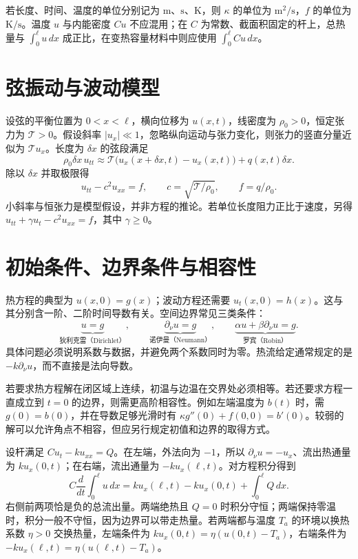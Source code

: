\documentclass[UTF8,12pt,a4paper,fontset=fandol]{ctexbook}
\begin{document}
若长度、时间、温度的单位分别记为 $\mathrm{m}$、$\mathrm{s}$、$\mathrm{K}$，则 $\kappa$ 的单位为 $\mathrm{m}^2/\mathrm{s}$，$f$ 的单位为 $\mathrm{K}/\mathrm{s}$。温度 $u$ 与内能密度 $Cu$ 不应混用；在 $C$ 为常数、截面积固定的杆上，总热量与 $\int_0^\ell u\,dx$ 成正比，在变热容量材料中则应使用 $\int_0^\ell Cu\,dx$。

\section{弦振动与波动模型}
设弦的平衡位置为 $0<x<\ell$，横向位移为 $u(x,t)$，线密度为 $\rho_0>0$，恒定张力为 $\mathcal T>0$。假设斜率 $|u_x|\ll1$，忽略纵向运动与张力变化，则张力的竖直分量近似为 $\mathcal T u_x$。长度为 $\delta x$ 的弦段满足
\[
 \rho_0\delta x\,u_{tt}\approx
 \mathcal T\bigl(u_x(x+\delta x,t)-u_x(x,t)\bigr)+q(x,t)\delta x.
\]
除以 $\delta x$ 并取极限得
\begin{equation}
 u_{tt}-c^2u_{xx}=f,\qquad
 c=\sqrt{\mathcal T/\rho_0},\qquad f=q/\rho_0.
 \label{eq:wave-model}
\end{equation}
小斜率与恒张力是模型假设，并非方程的推论。若单位长度阻力正比于速度，另得 $u_{tt}+\gamma u_t-c^2u_{xx}=f$，其中 $\gamma\ge0$。

\section{初始条件、边界条件与相容性}
热方程的典型为 $u(x,0)=g(x)$；波动方程还需要 $u_t(x,0)=h(x)$。这与其分别含一阶、二阶时间导数有关。空间边界常见三类条件：
\[
 \underbrace{u=g}_{\text{狄利克雷（Dirichlet）}},\qquad
 \underbrace{\partial_\nu u=g}_{\text{诺伊曼（Neumann）}},\qquad
 \underbrace{\alpha u+\beta\partial_\nu u=g}_{\text{罗宾（Robin）}}.
\]
具体问题必须说明系数与数据，并避免两个系数同时为零。热流给定通常规定的是 $-k\partial_\nu u$，而不直接是法向导数。

若要求热方程解在闭区域上连续，初温与边温在交界处必须相等。若还要求方程一直成立到 $t=0$ 的边界，则需更高阶相容性。例如左端温度为 $b(t)$ 时，需 $g(0)=b(0)$，并在导数足够光滑时有 $\kappa g''(0)+f(0,0)=b'(0)$。较弱的解可以允许角点不相容，但应另行规定初值和边界的取得方式。

\begin{example}[边界法向与总热量]
设杆满足 $C u_t-ku_{xx}=Q$。在左端，外法向为 $-1$，所以 $\partial_\nu u=-u_x$、流出热通量为 $ku_x(0,t)$；在右端，流出通量为 $-ku_x(\ell,t)$。对方程积分得到
\[
 C\frac d{dt}\int_0^\ell u\,dx
 =k u_x(\ell,t)-k u_x(0,t)+\int_0^\ell Q\,dx.
\]
右侧前两项恰是负的总流出量。两端绝热且 $Q=0$ 时积分守恒；两端保持零温时，积分一般不守恒，因为边界可以带走热量。若两端都与温度 $T_a$ 的环境以换热系数 $\eta>0$ 交换热量，左端条件为 $ku_x(0,t)=\eta(u(0,t)-T_a)$，右端条件为 $-ku_x(\ell,t)=\eta(u(\ell,t)-T_a)$。
\end{example}
\end{document}
